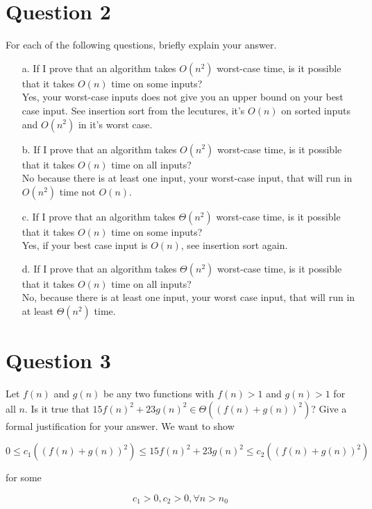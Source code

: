 \documentclass{article}
\begin{document}
\section*{Question 2}
For each of the following questions, briefly explain your answer.
\begin{enumerate}
\item[a.] If I prove that an algorithm takes $O(n^2)$ worst-case time, is it possible that it takes $O(n)$ time on some inputs? \\
Yes, your worst-case inputs does not give you an upper bound on your best case input.
See insertion sort from the lecutures, it's $O(n)$ on sorted inputs and $O(n^2)$ in it's worst case.

\item[b.] If I prove that an algorithm takes $O(n^2)$ worst-case time, is it possible that it takes $O(n)$ time on all inputs? \\
No because there is at least one input, your worst-case input, that will run in $O(n^2)$ time not $O(n)$.

\item[c.] If I prove that an algorithm takes $\Theta (n^2)$ worst-case time, is it possible that it takes $O(n)$ time on some inputs? \\
Yes, if your best case input is $O(n)$, see insertion sort again.

\item[d.] If I prove that an algorithm takes $\Theta (n^2)$ worst-case time, is it possible that it takes $O(n)$ time on all inputs? \\
No, because there is at least one input, your worst case input, that will run in at least $\Theta (n^2)$ time.

\end{enumerate}

\clearpage

\section*{Question 3}
Let $f(n)$ and $g(n)$ be any two functions with $f(n) > 1$ and $g(n) > 1$ for all $n$. Is it true that $15f(n)^2+23g(n)^2 \in \Theta((f(n)+g(n))^2)$? Give a formal justification for your answer.
We want to show

$$0 \leq c_{1}((f(n)+g(n))^2) \leq 15f(n)^2+23g(n)^2 \leq c_{2}((f(n)+g(n))^2)$$

for some

$$c_{1} > 0, c_{2} > 0, \forall n > n_{0}$$
\end{document}
